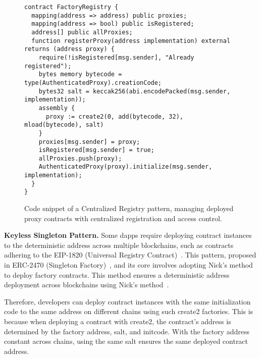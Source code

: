 \documentclass[acmsmall, screen]{acmart}
\begin{document}
	\begin{figure}[h]
		\begin{minipage}{0.95\linewidth}
			\begin{lstlisting}
contract FactoryRegistry {
  mapping(address => address) public proxies;
  mapping(address => bool) public isRegistered;
  address[] public allProxies;
  function registerProxy(address implementation) external returns (address proxy) {
    require(!isRegistered[msg.sender], "Already registered");
    bytes memory bytecode = type(AuthenticatedProxy).creationCode;
    bytes32 salt = keccak256(abi.encodePacked(msg.sender, implementation));
    assembly {
      proxy := create2(0, add(bytecode, 32), mload(bytecode), salt)
    }
    proxies[msg.sender] = proxy;
    isRegistered[msg.sender] = true;
    allProxies.push(proxy);
    AuthenticatedProxy(proxy).initialize(msg.sender, implementation);
  }
}
			\end{lstlisting}
		\end{minipage}
		\caption{Code snippet of a Centralized Registry pattern, managing deployed proxy contracts with
		centralized registration and access control.}
		\label{list:registry}
	\end{figure}

	\textbf{Keyless Singleton Pattern.} Some dapps require deploying contract instances to the deterministic
	address across multiple blockchains, such as contracts adhering to the EIP-1820 (Universal Registry
	Contract)~\cite{eip-1820}. This pattern, proposed in ERC-2470 (Singleton Factory)~\cite{eip-2470},
	and its core involves adopting Nick's method~\cite{nickmethod} to deploy factory contracts. This
	method ensures a deterministic address deployment across blockchains using Nick's method~\cite{nickmethod}.

	Therefore, developers can deploy contract instances with the same initialization code to the same
	address on different chains using such create2 factories. This is because when deploying a
	contract with create2, the contract's address is determined by the factory address, salt, and initcode.
	With the factory address constant across chains, using the same salt ensures the same deployed contract
	address.
\end{document}
